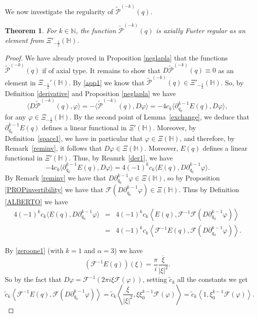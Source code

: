 \documentclass[reqno,11pt]{amsart}
\newtheorem{theorem}{Theorem}[section]
\theoremstyle{definition}
\begin{document}
We now investigate the regularity of $\widetilde{\mathcal{P}}^{(-k)}(q)$.

\begin{theorem}
For $k \in \mathbb{N}$, the function $\widetilde{\mathcal{P}}^{(-k)}(q)$ is axially Fueter regular as an element from $\Xi'_{-\frac{1}{2}}(\mathbb{H})$.
\end{theorem}
\begin{proof}
We have already proved in Proposition \ref{neglapla} that the functions $\widetilde{\mathcal{P}}^{(-k)}(q)$ if of axial type. It remains to show that $ D \widetilde{\mathcal{P}}^{(-k)}(q) \equiv 0$ as an element in $ \Xi_{-\frac{1}{2}}'(\mathbb{H})$. By \eqref{app1} we know that $ \widetilde{\mathcal{P}}^{(-k)}(q) \in \Xi'_{-\frac{1}{2}}(\mathbb{H})$. So, by Definition \ref{derivative} and Proposition \ref{neglapla} we have
$$ \langle D \widetilde{\mathcal{P}}^{(-k)}(q), \varphi \rangle=-\langle  \widetilde{\mathcal{P}}^{(-k)}(q), D\varphi \rangle=-4 c_k \langle  \partial_{q_0}^{k-1}E(q), D \varphi \rangle,$$
for any $\varphi \in \Xi_{-\frac{1}{2}}(\mathbb{H})$. By the second point of Lemma~\ref{exchange}, we deduce that $\partial_{q_0}^{k-1}E(q)$ defines a linear functional in $\Xi'(\mathbb{H})$. Moreover, by Definition~\ref{space1}, we have in particular that $\varphi \in \Xi(\mathbb{H})$, and therefore, by Remark~\ref{reminv}, it follows that $D\varphi \in \Xi(\mathbb{H})$. Moreover, $E(q)$ defines a linear functional in $\Xi'(\mathbb{H})$. Thus, by Reamrk~\ref{der1}, we have
$$ -4 c_k \langle  \partial_{q_0}^{k-1}E(q), D \varphi \rangle=4 (-1)^k c_k \langle  E(q), D \partial_{q_0}^{k-1} \varphi \rangle.$$
By Remark \ref{reminv} we have that $D \partial_{q_0}^{k-1} \varphi \in \Xi(\mathbb{H})$, so by Proposition \ref{PROPinvertibility} we have that $\mathcal{F}(D \partial_{q_0}^{k-1} \varphi) \in \Xi(\mathbb{H})$. Thus by Definition \ref{ALBERTO} we have
\begin{eqnarray*}
	4 (-1)^k c_k \langle  E(q), D \partial_{q_0}^{k-1} \varphi \rangle&=&4 (-1)^k c_k \left \langle  E(q), \mathcal{F}^{-1} \mathcal{F}\left(D \partial_{q_0}^{k-1} \varphi \right) \right \rangle\\
	&=&4 (-1)^k c_k \left \langle  \mathcal{F}^{-1} E(q),  \mathcal{F}\left(D \partial_{q_0}^{k-1} \varphi \right) \right \rangle.
\end{eqnarray*}

By \eqref{zeroone1} (with $k=1$ and $\alpha=3$) we have
$$ (\mathcal{F}^{-1}E(q))(\xi)= \frac{\pi}{i} \frac{\overline{\xi}}{|\xi|^2}.$$
So by the fact that $D \varphi= \mathcal{F}^{-1}(2 \pi i \xi \mathcal{F}(\varphi))$, setting $\widetilde{c}_k$ all the constants we get
$$\widetilde{c}_k \left \langle  \mathcal{F}^{-1} E(q),  \mathcal{F}\left(D \partial_{q_0}^{k-1} \varphi \right) \right\rangle=\widetilde{c}_k \left \langle   \frac{\overline{\xi}}{|\xi|^2},  \xi \xi_0^{k-1}\mathcal{F}(\varphi)  \right \rangle=\widetilde{c}_k \left \langle 1, \xi_{0}^{k-1} \mathcal{F}(\varphi) \right \rangle.$$


\end{proof}
\end{document}
